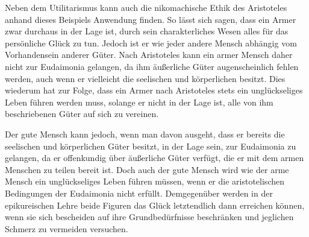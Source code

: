 Neben dem Utilitarismus kann auch die nikomachische Ethik des Aristoteles anhand dieses Beispiels Anwendung finden. 
So lässt sich sagen, dass ein Armer zwar durchaus in der Lage ist, durch sein charakterliches Wesen alles für das persönliche Glück zu tun. 
Jedoch ist er wie jeder andere Mensch abhängig vom Vorhandensein anderer Güter. 
Nach Aristoteles kann ein armer Mensch daher nicht zur Eudaimonia gelangen, da ihm äußerliche Güter augenscheinlich fehlen werden, auch wenn er vielleicht die seelischen und körperlichen besitzt. 
Dies wiederum hat zur Folge, dass ein Armer nach Aristoteles stets ein unglückseliges Leben führen werden muss, solange er nicht in der Lage ist, alle von ihm beschriebenen Güter auf sich zu vereinen. 

Der gute Mensch kann jedoch, wenn man davon ausgeht, dass er bereits die seelischen und körperlichen Güter besitzt, in der Lage sein, zur Eudaimonia zu gelangen, da er offenkundig über äußerliche Güter verfügt, die er mit dem armen Menschen zu teilen bereit ist. 
Doch auch der gute Mensch wird wie der arme Mensch ein unglückseliges Leben führen müssen, wenn er die aristotelischen Bedingungen der Eudaimonia nicht erfüllt. 
Demgegenüber werden in der epikureischen Lehre beide Figuren das Glück letztendlich dann erreichen können, wenn sie sich bescheiden auf ihre Grundbedürfnisse beschränken und jeglichen Schmerz zu vermeiden versuchen.
